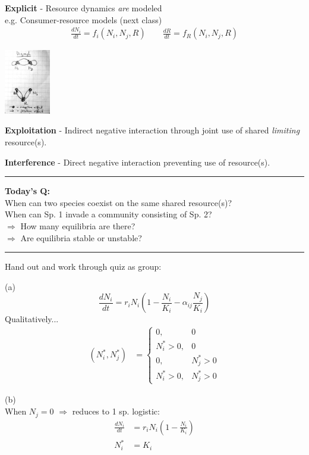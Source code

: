 \documentclass{article}
\newcommand{\note}[1]{\colorbox{gray!30}{#1}}
\newcommand{\ind}{\-\hspace{1cm}}
\begin{document}
\textbf{Explicit} - Resource dynamics \emph{are} modeled\\
\ind \ind e.g. Consumer-resource models (\note{next class})
\begin{align*}
	\frac{dN_i}{dt}=f_i(N_i,N_j,R) \quad \quad 
	\frac{dR}{dt}=f_R(N_i,N_j,R)
\end{align*}
\begin{center}
\includegraphics[width=2cm]{figs/Digraph_explicit.pdf}
\end{center}

\textbf{Exploitation} - Indirect negative interaction through joint use of shared \emph{limiting} resource(s).

\textbf{Interference} - Direct negative interaction preventing use of resource(s).

\rule[0.5ex]{\linewidth}{1pt}

\textbf{Today's Q:} \\ 
\ind When can two species coexist on the same shared resource(s)?\\
\ind When can Sp. 1 invade a community consisting of Sp. 2?\\
\ind \ind $\Rightarrow$ How many equilibria are there?\\
\ind \ind $\Rightarrow$ Are equilibria stable or unstable?\\

\rule[0.5ex]{\linewidth}{1pt}

\note{Hand out and work through quiz as group:}

(a)
\begin{equation*}
		\frac{dN_i}{dt}=r_i N_i \left (1-\frac{N_i}{K_i} - \alpha_{ij}\frac{N_j}{K_i}\right)
\end{equation*}
Qualitatively...
\begin{align*}
(N_i^*,N_j^*)& =
\begin{cases}
	0, & 0  \\
	N_i^* > 0, & 0  \\
	0, & N_j^* > 0\\
	N_i^* > 0, & N_j^* > 0
\end{cases}
\end{align*}

(b)\\
When $N_j=0$ $\Rightarrow$ reduces to 1 sp. logistic:
\begin{align*}
	\frac{dN_i}{dt} & =r_i N_i \left (1-\frac{N_i}{K_i} \right)\\
	N_i^*  & = K_i
\end{align*}
\end{document}
